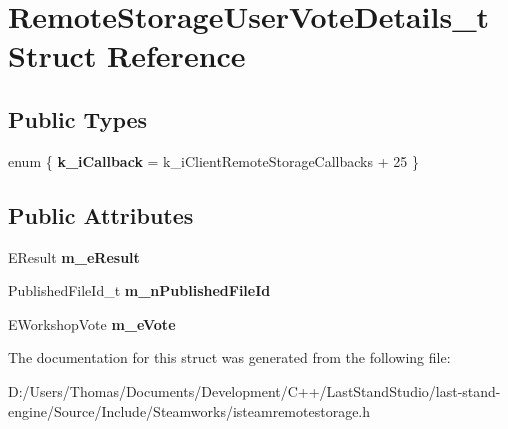 \hypertarget{structRemoteStorageUserVoteDetails__t}{}\section{Remote\+Storage\+User\+Vote\+Details\+\_\+t Struct Reference}
\label{structRemoteStorageUserVoteDetails__t}
\subsection*{Public Types}
\begin{DoxyCompactItemize}
\item 
\hypertarget{structRemoteStorageUserVoteDetails__t_a7775a946a14da1611d94ac534be33769}{}enum \{ {\bfseries k\+\_\+i\+Callback} = k\+\_\+i\+Client\+Remote\+Storage\+Callbacks + 25
 \}\label{structRemoteStorageUserVoteDetails__t_a7775a946a14da1611d94ac534be33769}

\end{DoxyCompactItemize}
\subsection*{Public Attributes}
\begin{DoxyCompactItemize}
\item 
\hypertarget{structRemoteStorageUserVoteDetails__t_af0711f77ce73f60ec19d9860395a8cb9}{}E\+Result {\bfseries m\+\_\+e\+Result}\label{structRemoteStorageUserVoteDetails__t_af0711f77ce73f60ec19d9860395a8cb9}

\item 
\hypertarget{structRemoteStorageUserVoteDetails__t_a66e337a2b7ffc6696b68944af2b1d18b}{}Published\+File\+Id\+\_\+t {\bfseries m\+\_\+n\+Published\+File\+Id}\label{structRemoteStorageUserVoteDetails__t_a66e337a2b7ffc6696b68944af2b1d18b}

\item 
\hypertarget{structRemoteStorageUserVoteDetails__t_a7be8e8c150b87ca38207685635b4eb80}{}E\+Workshop\+Vote {\bfseries m\+\_\+e\+Vote}\label{structRemoteStorageUserVoteDetails__t_a7be8e8c150b87ca38207685635b4eb80}

\end{DoxyCompactItemize}


The documentation for this struct was generated from the following file\+:\begin{DoxyCompactItemize}
\item 
D\+:/\+Users/\+Thomas/\+Documents/\+Development/\+C++/\+Last\+Stand\+Studio/last-\/stand-\/engine/\+Source/\+Include/\+Steamworks/isteamremotestorage.\+h\end{DoxyCompactItemize}

